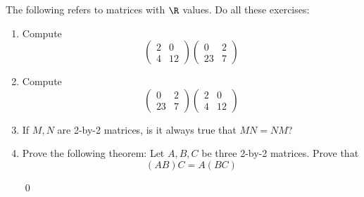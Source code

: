   The following refers to matrices with $\R$ values.
  Do all these exercises:
  \begin{enumerate}[nosep]

  \item Compute
    \[
    \begin{pmatrix}
      2 & 0 \\
      4 & 12 
    \end{pmatrix}
    \begin{pmatrix}
      0 & 2 \\
      23 & 7 
    \end{pmatrix}
    \]
    
  \item Compute
    \[
    \begin{pmatrix}
      0 & 2 \\
      23 & 7 
    \end{pmatrix}
    \begin{pmatrix}
      2 & 0 \\
      4 & 12 
    \end{pmatrix}
    \]
    
  \item If $M,N$ are 2-by-2 matrices, is it always true that
    $MN = NM$?

  \item
    Prove the following theorem: Let $A,B,C$ be three 2-by-2 matrices.
    Prove that
    \[
    (AB)C = A(BC)
    \]

    \qed
  \end{enumerate}
